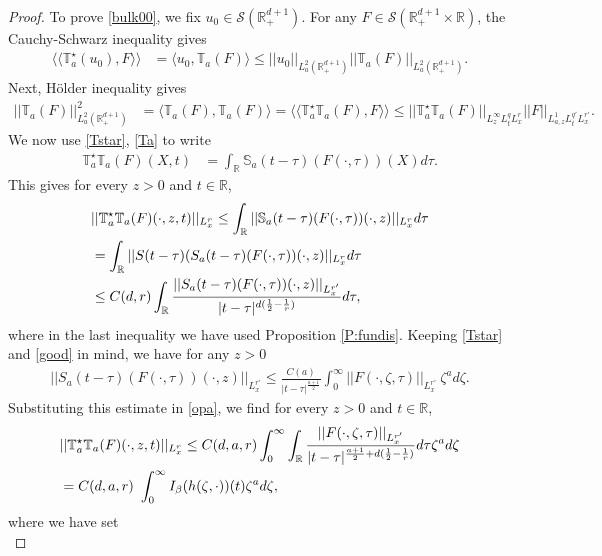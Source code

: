 \documentclass[11pt,letter]{amsart}
\def \RN {\mathbb{R}_+^{d+1}}
\def \R {\mathbb{R}}
\numberwithin{equation}{section}
\newcommand{\sa}{\langle}
\newcommand{\da}{\rangle}
\numberwithin{equation}{section}
\begin{document}
\begin{proof}
To prove \eqref{bulk00}, we fix $u_0\in \mathscr S(\RN)$. For any $F\in \mathscr S(\RN\times \R)$, the Cauchy-Schwarz inequality gives
\begin{align}\label{check}
\sa\sa \mathbb T^\star_a(u_0),F\da\da & = \sa u_0,\mathbb T_a(F)\da \le ||u_0||_{L_a^2(\RN)} ||\mathbb T_a(F)||_{L_a^2(\RN)}.
\end{align}
Next, H\"older inequality gives
\begin{align}\label{pop}
||\mathbb T_a(F)||^2_{L_a^2(\RN)} & = \sa \mathbb T_a(F),\mathbb T_a(F)\da = \sa\sa \mathbb T_a^\star \mathbb T_a(F),F\da\da \le ||\mathbb T_a^\star \mathbb T_a(F)||_{L^\infty_z L^q_t L^r_x } ||F||_{L^1_{a,z} L^{q'}_t L^{r'}_x }.
\end{align}
We now use \eqref{Tstar}, \eqref{Ta} to write
\begin{align}\label{stars}
\mathbb T_a^\star \mathbb T_a(F)(X,t) & = \int_\R \mathbb S_a(t-\tau)(F(\cdot,\tau))(X) d\tau.
\end{align}
This gives for every $z>0$ and $t\in \R$,
\begin{align}\label{opa}
& ||\mathbb T_a^\star \mathbb T_a(F)(\cdot,z,t)||_{L^r_x}  \le \int_{\R} ||\mathbb S_a(t-\tau)(F(\cdot,\tau))(\cdot,z)||_{L^r_x} d\tau 
\\
& = \int_{\R} ||S(t-\tau)(S_a(t-\tau)(F(\cdot,\tau))(\cdot,z)||_{L^r_x} d\tau
\notag
\\
& \le C(d,r) \int_{\R} \frac{||S_a(t-\tau)(F(\cdot,\tau))(\cdot,z)||_{L^{r'}_x}}{|t-\tau|^{d(\frac 12 - \frac 1r)}} d\tau, 
\notag
\end{align}
where in the last inequality we have used Proposition \ref{P:fundis}.
Keeping \eqref{Tstar} and \eqref{good} in mind, we have for any $z>0$
\begin{align*}
||S_a(t-\tau)(F(\cdot,\tau))(\cdot,z)||_{L^{r'}_x} \le \frac{C(a)}{|t-\tau|^{\frac{a+1}2}} \int_0^\infty ||F(\cdot,\zeta,\tau)||_{L^{r'}_x}\  \zeta^a d\zeta.
\end{align*}
Substituting this estimate in \eqref{opa}, we find for every $z>0$ and $t\in \R$,
\begin{align}\label{opa2}
& ||\mathbb T_a^\star \mathbb T_a(F)(\cdot,z,t)||_{L^r_x} \le C(d,a,r) \int_0^\infty \int_{\R} \frac{||F(\cdot,\zeta, \tau)||_{L^{r'}_x}}{|t-\tau|^{\frac{a+1}2+d(\frac 12 - \frac 1r)}} d\tau \zeta^a d\zeta
\\
& = C(d,a,r)\ \int_0^\infty I_\beta(h(\zeta,\cdot))(t) \zeta^a d\zeta,
\notag
\end{align}
where we have set
\begin{equation}\label{hzetatau}

\end{equation}
\end{proof}
\end{document}
